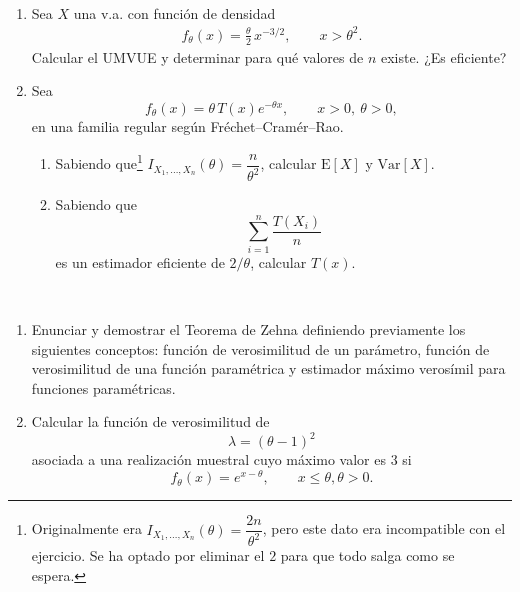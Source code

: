 \documentclass[12pt]{article}
\begin{document}
    \begin{ejercicio}~
        \begin{enumerate}
            \item[a)] Sea $X$ una v.a. con función de densidad
            \begin{gather}
                f_\theta(x)=\frac{\theta}{2}\,x^{-3/2}, \qquad x>\theta^2.
            \end{gather}
            Calcular el UMVUE y determinar para qué valores de $n$ existe.
            ¿Es eficiente?

            \item[b)] Sea
            $$
            f_\theta(x)=\theta\,T(x)e^{-\theta x}, \qquad x>0,\ \theta>0,
            $$
            en una familia regular según Fréchet--Cramér--Rao.
            \begin{enumerate}
                \item[b1)] Sabiendo que\footnote{Originalmente era $I_{X_1,\dots,X_n}(\theta)=\dfrac{2n}{\theta^2}$, pero este dato era incompatible
                con el ejercicio. Se ha optado por eliminar el $2$ para que todo salga como se espera.} $I_{X_1,\dots,X_n}(\theta)=\dfrac{n}{\theta^2}$, calcular
                $\mathrm{E}[X]$ y $\mathrm{Var}[X]$.
                \item[b2)] Sabiendo que $$\sum_{i=1}^n \dfrac{T(X_i)}{n}$$ es un estimador eficiente de $2/\theta$,
                calcular $T(x)$.
            \end{enumerate}
        \end{enumerate}
    \end{ejercicio}

    \begin{ejercicio}~
        \begin{enumerate}
            \item[a)] Enunciar y demostrar el Teorema de Zehna definiendo previamente los siguientes
            conceptos: función de verosimilitud de un parámetro, función de verosimilitud de una
            función paramétrica y estimador máximo verosímil para funciones paramétricas.

            \item[b)] Calcular la función de verosimilitud de $$\lambda=(\theta-1)^2$$
            asociada a una realización muestral cuyo máximo valor es $3$ si $$f_\theta(x)=e^{x-\theta}, \qquad x \leqslant \theta, \theta>0.$$
        \end{enumerate}
    \end{ejercicio}
\end{document}
